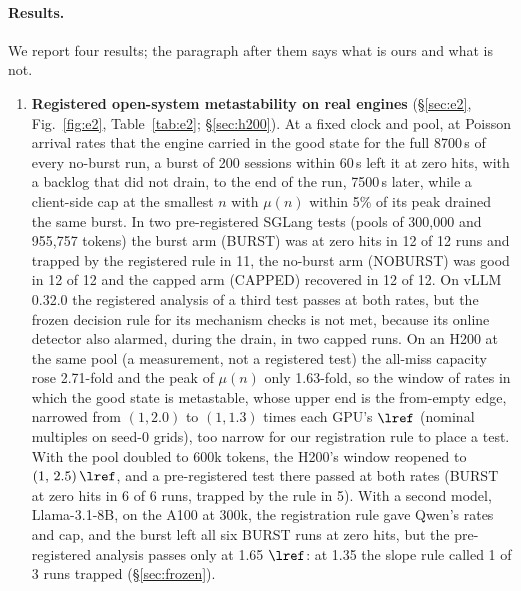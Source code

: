 \paragraph{Results.} We report four results; the paragraph after them says what is ours and what is not.
\begin{enumerate}[label=(\arabic*),leftmargin=*]
\item \textbf{Registered open-system metastability on real engines} (\S\ref{sec:e2}, Fig.~\ref{fig:e2}, Table~\ref{tab:e2}; \S\ref{sec:h200}). At a fixed clock and pool, at Poisson arrival rates that the engine carried in the good state for the full 8700\,s of every no-burst run, a burst of 200 sessions within 60\,s left it at zero hits, with a backlog that did not drain, to the end of the run, 7500\,s later, while a client-side cap at the smallest $n$ with $\mu(n)$ within 5\% of its peak drained the same burst. In two pre-registered SGLang tests (pools of 300,000 and 955,757 tokens) the burst arm (BURST) was at zero hits in 12 of 12 runs and trapped by the registered rule in 11, the no-burst arm (NOBURST) was good in 12 of 12 and the capped arm (CAPPED) recovered in 12 of 12. On vLLM 0.32.0 the registered analysis of a third test passes at both rates, but the frozen decision rule for its mechanism checks is not met, because its online detector also alarmed, during the drain, in two capped runs. On an H200 at the same pool (a measurement, not a registered test) the all-miss capacity rose 2.71-fold and the peak of $\mu(n)$ only 1.63-fold, so the window of rates in which the good state is metastable, whose upper end is the from-empty edge, narrowed from $(1,2.0)$ to $(1,1.3)$ times each GPU's $\lref$ (nominal multiples on seed-0 grids), too narrow for our registration rule to place a test. With the pool doubled to 600k tokens, the H200's window reopened to $(1,\,2.5)\,\lref$, and a pre-registered test there passed at both rates (BURST at zero hits in 6 of 6 runs, trapped by the rule in 5). With a second model, Llama-3.1-8B, on the A100 at 300k, the registration rule gave Qwen's rates and cap, and the burst left all six BURST runs at zero hits, but the pre-registered analysis passes only at 1.65 $\lref$: at 1.35 the slope rule called 1 of 3 runs trapped (\S\ref{sec:frozen}).

\end{enumerate}
